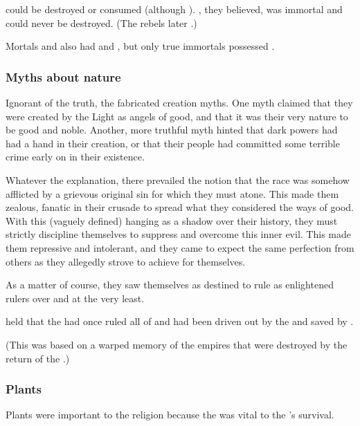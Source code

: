 \Iai could be destroyed or consumed (although ). 
\Iath, they believed, was immortal and could never be destroyed. 
(The rebels later .)

Mortals and \ashenbloods also had \iod and \iai, but only true immortals possessed \iath. 





\subsubsection{Myths about \resphan nature}
Ignorant of the truth, the \Merkyrans{} fabricated creation myths. 
One myth claimed that they were created by the Light as angels of good, and that it was their very nature to be good and noble. 
Another, more truthful myth hinted that dark powers had had a hand in their creation, or that their people had committed some terrible crime early on in their existence. 

Whatever the explanation, there prevailed the notion that the \resphan{} race was somehow afflicted by a grievous original sin for which they must atone. 
This made them zealous, fanatic in their crusade to spread what they considered the ways of good. 
With this (vaguely defined)  hanging as a shadow over their history, they must strictly discipline themselves to suppress and overcome this inner evil. 
This made them repressive and intolerant, and they came to expect the same perfection from others as they allegedly strove to achieve for themselves. 

As a matter of course, they saw themselves as destined to rule as enlightened rulers over \humans{} and \nephilim{} at the very least. 

 held that the \resphain had once ruled all of \Nyx and had been driven out by the  and saved by . 

(This was based on a warped memory of the \aryoth empires that were destroyed by the return of the \dragons.) 





\subsubsection{Plants}
Plants were important to the \Merkyran religion because the  was vital to the \resphain's survival. 





